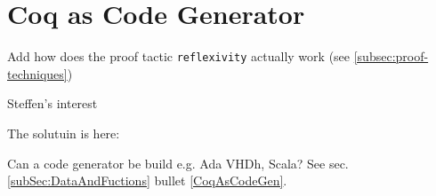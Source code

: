\section{Coq as Code Generator}
\label{sec:coqAsACodeGenerator}

Add how does the proof tactic \lstinline!reflexivity! actually work \label{sec:reflexivity} (see \ref{subsec:proof-techniques})

Steffen's interest

The solutuin is here: \cite{ExtractingProgrammsinOCAMlandHaskell}

Can a code generator be build e.g. Ada VHDh, Scala? See sec. \ref{subSec:DataAndFuctions} bullet \ref{CoqAsCodeGen}.


% 
% 
